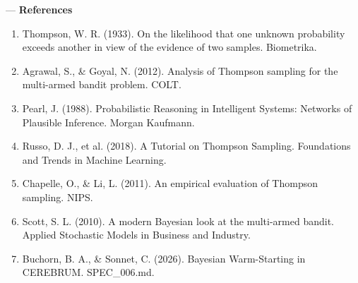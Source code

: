---
\textbf{References}
\begin{enumerate}
\item Thompson, W. R. (1933). On the likelihood that one unknown probability exceeds another in view of the evidence of two samples. Biometrika.
\item Agrawal, S., \& Goyal, N. (2012). Analysis of Thompson sampling for the multi-armed bandit problem. COLT.
\item Pearl, J. (1988). Probab\-ilistic Reasoning in Intelligent Systems: Networks of Plausible Inference. Morgan Kaufmann.
\item Russo, D. J., et al. (2018). A Tutorial on Thompson Sampling. Foundations and Trends in Machine Learning.
\item Chapelle, O., \& Li, L. (2011). An empirical evaluation of Thompson sampling. NIPS.
\item Scott, S. L. (2010). A modern Bayesian look at the multi-armed bandit. Applied Stochastic Models in Business and Industry.
\item Buchorn, B. A., \& Sonnet, C. (2026). Bayesian Warm-Starting in CEREBRUM. SPEC\_006.md.

\end{enumerate}